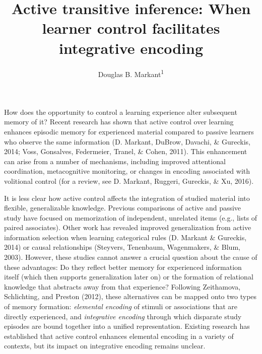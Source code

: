 \documentclass[floatsintext,man]{apa6}
\title{Active transitive inference: When learner control facilitates
integrative encoding}
\author{Douglas B. Markant\textsuperscript{1}}
\affiliation{
    \vspace{0.5cm}
          \textsuperscript{1} Department of Psychological Science, University of North Carolina at
Charlotte  }
\theoremstyle{definition}
\theoremstyle{definition}
\theoremstyle{definition}
\theoremstyle{remark}
\begin{document}
\maketitle

\setcounter{secnumdepth}{0}



How does the opportunity to control a learning experience alter
subsequent memory of it? Recent research has shown that active control
over learning enhances episodic memory for experienced material compared
to passive learners who observe the same information (D. Markant,
DuBrow, Davachi, \& Gureckis, 2014; Voss, Gonsalves, Federmeier, Tranel,
\& Cohen, 2011). This enhancement can arise from a number of mechanisms,
including improved attentional coordination, metacognitive monitoring,
or changes in encoding associated with volitional control (for a review,
see D. Markant, Ruggeri, Gureckis, \& Xu, 2016).

It is less clear how active control affects the integration of studied
material into flexible, generalizable knowledge. Previous comparisons of
active and passive study have focused on memorization of independent,
unrelated items (e.g., lists of paired associates). Other work has
revealed improved generalization from active information selection when
learning categorical rules (D. Markant \& Gureckis, 2014) or causal
relationships (Steyvers, Tenenbaum, Wagenmakers, \& Blum, 2003).
However, these studies cannot answer a crucial question about the cause
of these advantages: Do they reflect better memory for experienced
information itself (which then supports generalization later on) or the
formation of relational knowledge that abstracts away from that
experience? Following Zeithamova, Schlichting, and Preston (2012), these
alternatives can be mapped onto two types of memory formation:
\emph{elemental encoding} of stimuli or associations that are directly
experienced, and \emph{integrative encoding} through which disparate
study episodes are bound together into a unified representation.
Existing research has established that active control enhances elemental
encoding in a variety of contexts, but its impact on integrative
encoding remains unclear.
\end{document}
